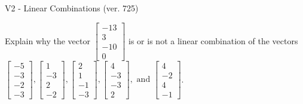 \begin{exercise}
  \begin{exerciseTitle}V2 - Linear Combinations (ver. 725)\end{exerciseTitle}
  \begin{exerciseStatement}
    Explain why the vector \(\left[\begin{array}{c}
-13 \\
3 \\
-10 \\
0
\end{array}\right]\)  is or is not a linear 
	combination of the vectors \(\left[\begin{array}{c}
-5 \\
-3 \\
-2 \\
-3
\end{array}\right] , \left[\begin{array}{c}
1 \\
-3 \\
2 \\
-2
\end{array}\right] , \left[\begin{array}{c}
2 \\
1 \\
-1 \\
-3
\end{array}\right] , \left[\begin{array}{c}
4 \\
-3 \\
-3 \\
2
\end{array}\right] , \text{ and } \left[\begin{array}{c}
4 \\
-2 \\
4 \\
-1
\end{array}\right]\).
	



\end{exerciseStatement}
\end{exercise}
